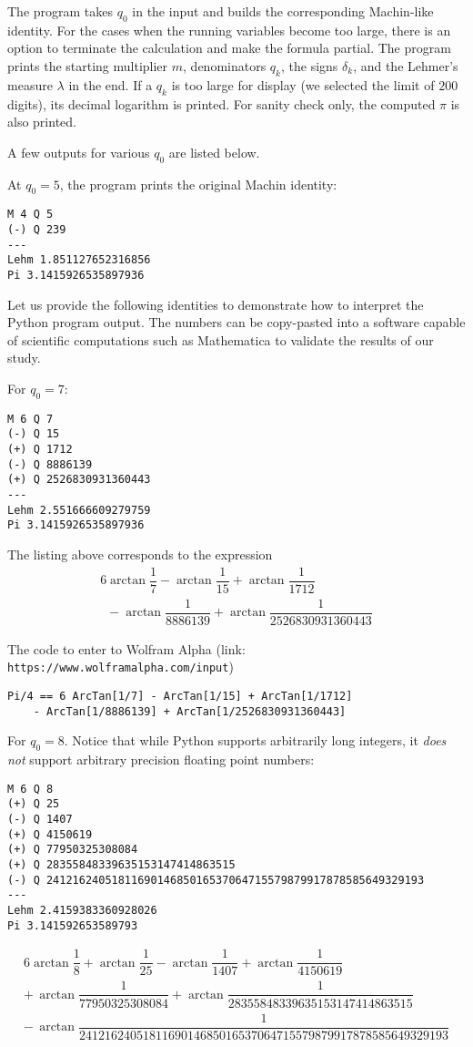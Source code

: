 \documentclass[draft, 10pt]{article} %
\begin{document}
The program takes $q_0$ in the input and builds the corresponding Machin-like identity.
For the cases when the running variables become too large, there is an option
to terminate the calculation and make the formula partial. The program prints the starting
multiplier $m$, denominators $q_k$, the signs $\delta_k$, and the Lehmer's
measure $\lambda$ in the end. If a $q_k$ is too large for display (we selected the limit of $200$ digits),
its decimal logarithm is printed. For sanity check only, the computed $\pi$ is also printed.

A few outputs for various $q_0$ are listed below.

At $q_0 = 5$, the program prints the original Machin identity:
\begin{verbatim}
M 4 Q 5
(-) Q 239
---
Lehm 1.851127652316856
Pi 3.1415926535897936
\end{verbatim}

Let us provide the following identities to demonstrate how to interpret
the Python program output. The numbers can be copy-pasted into a software
capable of scientific computations such as Mathematica to validate the results of our study.

For $q_0 = 7$:
\begin{verbatim}
M 6 Q 7
(-) Q 15
(+) Q 1712
(-) Q 8886139
(+) Q 2526830931360443
---
Lehm 2.551666609279759 
Pi 3.1415926535897936
\end{verbatim}

The listing above corresponds to the expression
$$
\begin{array}{l}
6 \arctan\dfrac{1}{7} - \arctan\dfrac{1}{15} + \arctan\dfrac{1}{1712} \\[0.75em]
\phantom{0} - \arctan\dfrac{1}{8886139} + \arctan\dfrac{1}{2526830931360443}
\end{array}
$$

The code to enter to Wolfram Alpha\hfill\break
(link: {\tt https://www.wolframalpha.com/input\/})
\begin{verbatim}
Pi/4 == 6 ArcTan[1/7] - ArcTan[1/15] + ArcTan[1/1712]
    - ArcTan[1/8886139] + ArcTan[1/2526830931360443] 
\end{verbatim}

\pagebreak
For $q_0 = 8$.
Notice that while Python supports arbitrarily long integers, it {\it does not\/}
support arbitrary precision floating point numbers:
\begin{verbatim}
M 6 Q 8
(+) Q 25
(-) Q 1407
(+) Q 4150619
(+) Q 77950325308084
(+) Q 28355848339635153147414863515
(-) Q 2412162405181169014685016537064715579879917878585649329193
---
Lehm 2.4159383360928026 
Pi 3.141592653589793
\end{verbatim}
$$
\begin{array}{l}
6 \arctan\dfrac{1}{8}
+ \arctan\dfrac{1}{25}
- \arctan\dfrac{1}{1407}
+ \arctan\dfrac{1}{4150619} \\[0.75em]
+\, \arctan\dfrac{1}{77950325308084}
+ \arctan\dfrac{1}{28355848339635153147414863515} \\[0.75em]
-\, \arctan\dfrac{1}{2412162405181169014685016537064715579879917878585649329193}
\end{array}
$$
\end{document}
